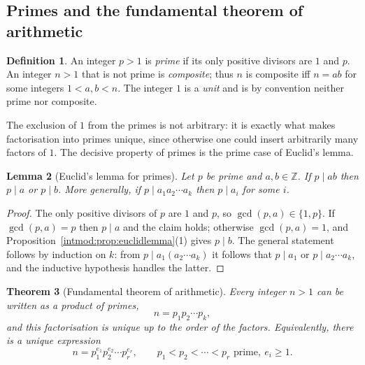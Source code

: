\documentclass[11pt,a4paper]{article}
\newtheorem{theorem}{Theorem}[section]
\newtheorem{lemma}[theorem]{Lemma}
\theoremstyle{definition}
\newtheorem{definition}[theorem]{Definition}
\theoremstyle{remark}
\newcommand{\Z}{\ensuremath{\mathbb{Z}}}
\begin{document}
\subsection{Primes and the fundamental theorem of arithmetic}\label{intmod:sub:primes}

\begin{definition}\label{intmod:def:prime}
An integer \(p>1\) is \emph{prime} if its only positive divisors are \(1\) and \(p\). An integer \(n>1\) that is not prime is \emph{composite}; thus \(n\) is composite iff \(n=ab\) for some integers \(1<a,b<n\). The integer \(1\) is a \emph{unit} and is by convention neither prime nor composite.
\end{definition}

The exclusion of \(1\) from the primes is not arbitrary: it is exactly what makes factorisation into primes unique, since otherwise one could insert arbitrarily many factors of \(1\). The decisive property of primes is the prime case of Euclid's lemma.

\begin{lemma}[Euclid's lemma for primes]\label{intmod:lem:primedivides}
Let \(p\) be prime and \(a,b\in\Z\). If \(p\mid ab\) then \(p\mid a\) or \(p\mid b\). More generally, if \(p\mid a_1a_2\cdots a_k\) then \(p\mid a_i\) for some \(i\).
\end{lemma}

\begin{proof}
The only positive divisors of \(p\) are \(1\) and \(p\), so \(\gcd(p,a)\in\{1,p\}\). If \(\gcd(p,a)=p\) then \(p\mid a\) and the claim holds; otherwise \(\gcd(p,a)=1\), and Proposition~\ref{intmod:prop:euclidlemma}(1) gives \(p\mid b\). The general statement follows by induction on \(k\): from \(p\mid a_1(a_2\cdots a_k)\) it follows that \(p\mid a_1\) or \(p\mid a_2\cdots a_k\), and the inductive hypothesis handles the latter.
\end{proof}

\begin{theorem}[Fundamental theorem of arithmetic]\label{intmod:thm:fta}
Every integer \(n>1\) can be written as a product of primes,
\[
n = p_1 p_2 \cdots p_k,
\]
and this factorisation is unique up to the order of the factors. Equivalently, there is a unique expression
\[
n = p_1^{e_1} p_2^{e_2}\cdots p_r^{e_r}, \qquad p_1<p_2<\cdots<p_r \text{ prime},\ e_i\ge 1.
\]
\end{theorem}
\end{document}
